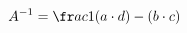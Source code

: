 \documentclass[preview]{standalone}
\begin{document}
\begin{align*}
A^{-1}  = \fr a c{1}{( a  \cdot d) - (b \cdot c)}
\end{align*}
\end{document}
